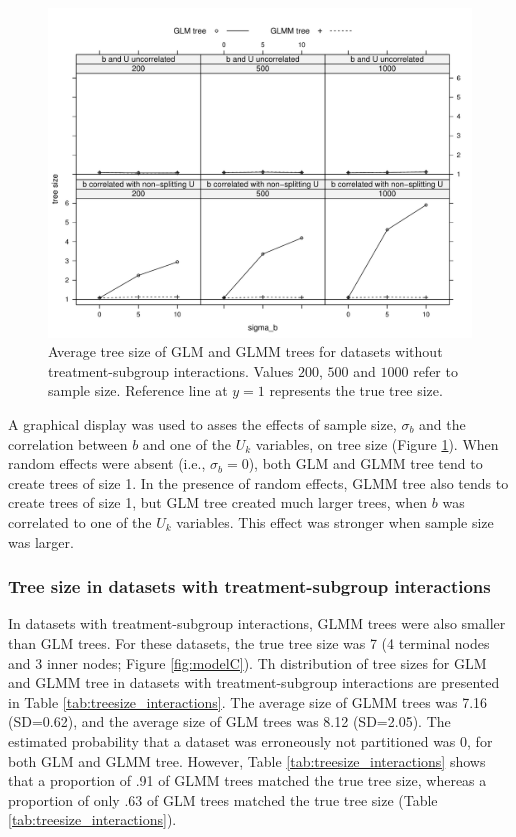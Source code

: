 \documentclass[nobf,doc]{apa}
\begin{document}
\begin{figure}[!htbp]
	\includegraphics[width=15cm]{xy_treesizes_maineff.pdf}
	\caption{Average tree size of GLM and GLMM trees for datasets without treatment-subgroup interactions. Values $200$, $500$ and $1000$ refer to sample size. Reference line at $y=1$ represents the true tree size.}
	\label{fig:xyplot_treesize_nointeract}
\end{figure}


A graphical display was used to asses the effects of sample size, $\sigma_b$ and the correlation between $b$ and one of the $U_k$ variables, on tree size (Figure \ref{fig:xyplot_treesize_nointeract}). When random effects were absent (i.e., $\sigma_{b}=0$), both GLM and GLMM tree tend to create trees of size 1. In the presence of random effects, GLMM tree also tends to create trees of size 1, but GLM tree created much larger trees, when $b$ was correlated to one of the $U_k$ variables. This effect was stronger when sample size was larger. 







\subsubsection{Tree size in datasets with treatment-subgroup interactions}

In datasets with treatment-subgroup interactions, GLMM trees were also smaller than GLM trees. For these datasets, the true tree size was 7 (4 terminal nodes and 3 inner nodes; Figure \ref{fig:modelC}). Th distribution of tree sizes for GLM and GLMM tree in datasets with treatment-subgroup interactions are presented in Table \ref{tab:treesize_interactions}. The average size of GLMM trees was 7.16 (SD=0.62), and the average size of GLM trees was 8.12 (SD=2.05). The estimated probability that a dataset was erroneously not partitioned was 0, for both GLM and GLMM tree. However, Table \ref{tab:treesize_interactions} shows that a proportion of .91 of GLMM trees matched the true tree size, whereas a proportion of only .63 of GLM trees matched the true tree size (Table \ref{tab:treesize_interactions}).
\end{document}
